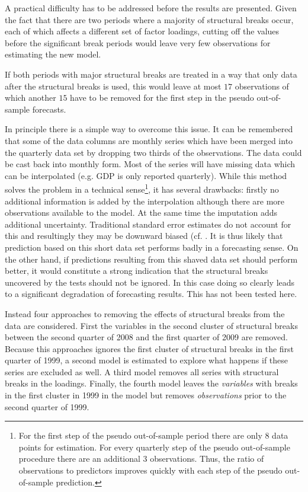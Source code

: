 \documentclass[12pt]{article}
\begin{document}
A practical difficulty has to be addressed before the results are presented. Given the fact that there are two periods where a majority of structural breaks occur, each of which affects a different set of factor loadings, cutting off the values before the significant break periods would leave very few observations for estimating the new model.

If both periods with major structural breaks are treated in a way that only data after the structural breaks is used, this would leave at most $17$ observations of which another $15$ have to be removed for the first step in the pseudo out-of-sample forecasts.

In principle there is a simple way to overcome this issue. It can be remembered that some of the data columns are monthly series which have been merged into the quarterly data set by dropping two thirds of the observations. The data could be cast back into monthly form. Most of the series will have missing data which can be interpolated (e.g. GDP is only reported quarterly). While this method solves the problem in a technical sense\footnote{For the first step of the pseudo out-of-sample period there are only $8$ data points for estimation. For every quarterly step of the pseudo out-of-sample procedure there are an additional $3$ observations. Thus, the ratio of observations to predictors improves quickly with each step of the pseudo out-of-sample prediction.}, it has several drawbacks: firstly no additional information is added by the interpolation although there are more observations available to the model. At the same time the imputation adds additional uncertainty. Traditional standard error estimates do not account for this and resultingly they may be downward biased (cf. \citet[chapter~25]{gelman2006missing}. It is thus likely that prediction based on this short data set performs badly in a forecasting sense. On the other hand, if predictions resulting from this shaved data set should perform better, it would constitute a strong indication that the structural breaks uncovered by the tests should not be ignored. In this case doing so clearly leads to a significant degradation of forecasting results. This has not been tested here. 

Instead four approaches to removing the effects of structural breaks from the data are considered. First the variables in the second cluster of structural breaks between the second quarter of 2008 and the first quarter of 2009 are removed. Because this approaches ignores the first cluster of structural breaks in the first quarter of 1999, a second model is estimated to explore what happens if these series are excluded as well. A third model removes all series with structural breaks in the loadings. Finally, the fourth model leaves the \textit{variables} with breaks in the first cluster in 1999 in the model but removes \textit{observations} prior to the second quarter of 1999. 
\end{document}
